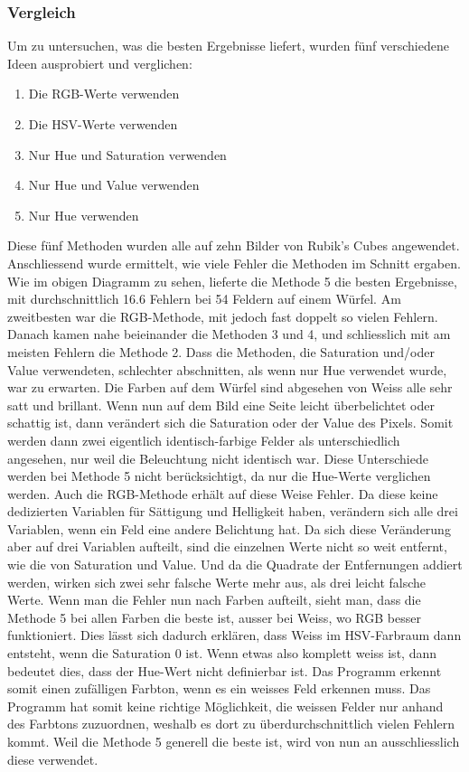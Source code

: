 \documentclass[a4paper, 12pt]{article}
\begin{document}
\subsubsection{Vergleich}
Um zu untersuchen, was die besten Ergebnisse liefert, wurden fünf verschiedene Ideen ausprobiert und verglichen:
\begin{enumerate}
  \item Die RGB-Werte verwenden
  \item Die HSV-Werte verwenden
  \item Nur Hue und Saturation verwenden
  \item Nur Hue und Value verwenden
  \item Nur Hue verwenden
\end{enumerate}
Diese fünf Methoden wurden alle auf zehn Bilder von Rubik's Cubes angewendet. Anschliessend wurde ermittelt, wie viele Fehler die Methoden im Schnitt ergaben. 
\noindent
Wie im obigen Diagramm zu sehen, lieferte die Methode 5 die besten Ergebnisse, mit durchschnittlich 16.6 Fehlern bei 54 Feldern auf einem Würfel. Am zweitbesten war die RGB-Methode, mit jedoch fast doppelt so vielen Fehlern. Danach kamen nahe beieinander die Methoden 3 und 4, und schliesslich mit am meisten Fehlern die Methode 2. Dass die Methoden, die Saturation und/oder Value verwendeten, schlechter abschnitten, als wenn nur Hue verwendet wurde, war zu erwarten. Die Farben auf dem Würfel sind abgesehen von Weiss alle sehr satt und brillant. Wenn nun auf dem Bild eine Seite leicht überbelichtet oder schattig ist, dann verändert sich die Saturation oder der Value des Pixels. Somit werden dann zwei eigentlich identisch-farbige Felder als unterschiedlich angesehen, nur weil die Beleuchtung nicht identisch war. Diese Unterschiede werden bei Methode 5 nicht berücksichtigt, da nur die Hue-Werte verglichen werden. Auch die RGB-Methode erhält auf diese Weise Fehler. Da diese keine dedizierten Variablen für Sättigung und Helligkeit haben, verändern sich alle drei Variablen, wenn ein Feld eine andere Belichtung hat. Da sich diese Veränderung aber auf drei Variablen aufteilt, sind die einzelnen Werte nicht so weit entfernt, wie die von Saturation und Value. Und da die Quadrate der Entfernungen addiert werden, wirken sich zwei sehr falsche Werte mehr aus, als drei leicht falsche Werte. 
\noindent
Wenn man die Fehler nun nach Farben aufteilt, sieht man, dass die Methode 5 bei allen Farben die beste ist, ausser bei Weiss, wo RGB besser funktioniert. Dies lässt sich dadurch erklären, dass Weiss im HSV-Farbraum dann entsteht, wenn die Saturation 0 ist. Wenn etwas also komplett weiss ist, dann bedeutet dies, dass der Hue-Wert nicht definierbar ist. Das Programm erkennt somit einen zufälligen Farbton, wenn es ein weisses Feld erkennen muss. Das Programm hat somit keine richtige Möglichkeit, die weissen Felder nur anhand des Farbtons zuzuordnen, weshalb es dort zu überdurchschnittlich vielen Fehlern kommt.
\newline
Weil die Methode 5 generell die beste ist, wird von nun an ausschliesslich diese verwendet. 
\end{document}
